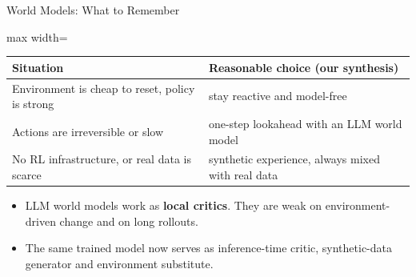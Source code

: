\begin{frame}{World Models: What to Remember}
    \begin{center}
    \small
    \renewcommand{\arraystretch}{1.2}
    \begin{adjustbox}{max width=\linewidth}\begin{tabular}{>{\raggedright\arraybackslash}p{5.4cm}>{\raggedright\arraybackslash}p{7.4cm}}
        \toprule
        \textbf{Situation} & \textbf{Reasonable choice (our synthesis)} \\
        \midrule
        Environment is cheap to reset, policy is strong & stay reactive and model-free \\
        Actions are irreversible or slow & one-step lookahead with an LLM world model \\
        No RL infrastructure, or real data is scarce & synthetic experience, always mixed with real data \\
        \bottomrule
    \end{tabular}\end{adjustbox}
    \end{center}
    \begin{itemize}\itemsep0.5em
        \item LLM world models work as \textbf{local critics}. They are weak on environment-driven change and on long rollouts.
        \item The same trained model now serves as inference-time critic, synthetic-data generator and environment substitute.
    \end{itemize}
    \vspace{0.2em}
    
\end{frame}
